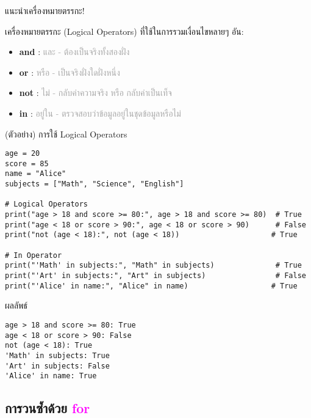 \documentclass[12pt,a4paper]{article}
\newcommand{\textlight}[1]{{\thailightfont #1}}
\begin{document}
\begin{noticebox}{แนะนำเครื่องหมายตรรกะ!}

\textlight{เครื่องหมายตรรกะ (Logical Operators) ที่ใช้ในการรวมเงื่อนไขหลายๆ อัน:}

\begin{itemize}
    \item \textbf{and} : \textcolor{darkgray}{และ - ต้องเป็นจริงทั้งสองฝั่ง}
    \item \textbf{or} : \textcolor{darkgray}{หรือ - เป็นจริงฝั่งใดฝั่งหนึ่ง}
    \item \textbf{not} : \textcolor{darkgray}{ไม่ - กลับค่าความจริง หรือ กลับค่าเป็นเท็จ}
    \item \textbf{in} : \textcolor{darkgray}{อยู่ใน - ตรวจสอบว่าข้อมูลอยู่ในชุดข้อมูลหรือไม่}
\end{itemize}

\begin{codebox}{(ตัวอย่าง) การใช้ Logical Operators}
\begin{lstlisting}[style=python]
age = 20
score = 85
name = "Alice"
subjects = ["Math", "Science", "English"]

# Logical Operators
print("age > 18 and score >= 80:", age > 18 and score >= 80)  # True
print("age < 18 or score > 90:", age < 18 or score > 90)      # False
print("not (age < 18):", not (age < 18))                     # True

# In Operator
print("'Math' in subjects:", "Math" in subjects)              # True
print("'Art' in subjects:", "Art" in subjects)                # False
print("'Alice' in name:", "Alice" in name)                   # True
\end{lstlisting}
\end{codebox}

\begin{resultbox}{ผลลัพธ์}
\begin{verbatim}
age > 18 and score >= 80: True
age < 18 or score > 90: False
not (age < 18): True
'Math' in subjects: True
'Art' in subjects: False
'Alice' in name: True
\end{verbatim}
\end{resultbox}

\end{noticebox}

\vspace{3cm}

\subsection{การวนซ้ำด้วย \textcolor{magenta}{for}}
\end{document}
